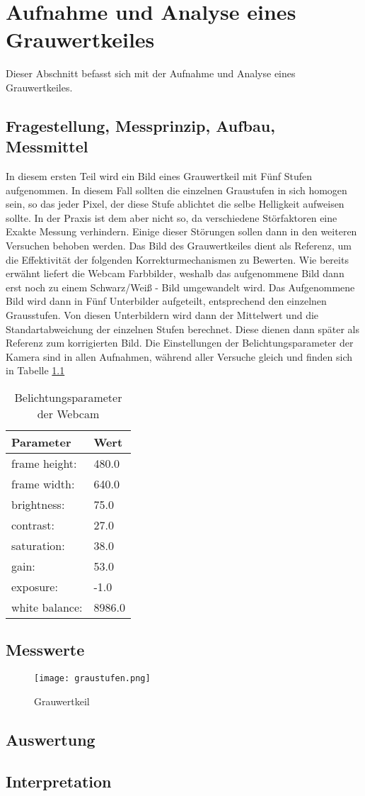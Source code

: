 %
%
\chapter{Aufnahme und Analyse eines Grauwertkeiles}
\label{chap:VERSUCH_1}
Dieser Abschnitt befasst sich mit der Aufnahme und Analyse eines Grauwertkeiles.
\section{Fragestellung, Messprinzip, Aufbau, Messmittel}
\label{chap:VERSUCH_1_FRAGESTELLUNG}
In diesem ersten Teil wird ein Bild eines Grauwertkeil mit Fünf Stufen aufgenommen. In diesem Fall sollten die einzelnen Graustufen in sich homogen sein, so das jeder Pixel, der diese Stufe ablichtet die selbe Helligkeit aufweisen sollte. In der Praxis ist dem aber nicht so, da verschiedene Störfaktoren eine Exakte Messung verhindern. Einige dieser Störungen sollen dann in den weiteren Versuchen behoben werden. Das Bild des Grauwertkeiles dient als Referenz, um die Effektivität der folgenden Korrekturmechanismen zu Bewerten. Wie bereits erwähnt liefert die Webcam Farbbilder, weshalb das aufgenommene Bild dann erst noch zu einem Schwarz/Weiß - Bild umgewandelt wird. Das Aufgenommene Bild wird dann in Fünf Unterbilder aufgeteilt, entsprechend den einzelnen Grausstufen. Von diesen Unterbildern wird dann der Mittelwert und die Standartabweichung der einzelnen Stufen berechnet. Diese dienen dann später als Referenz zum korrigierten Bild. Die Einstellungen der Belichtungsparameter der Kamera sind in allen Aufnahmen, während aller Versuche gleich und finden sich in Tabelle \ref{tab:BelichtungsParamter}
\begin{table}
\centering
\begin{tabular}{l|l}
Parameter & Wert \\
\hline
frame height: & 480.0 \\
frame width: & 640.0 \\
brightness:  &  75.0 \\
contrast:    &  27.0 \\
saturation:  &  38.0\\
gain:        &  53.0\\
exposure:    &  -1.0\\
white balance: & 8986.0 \\
\end{tabular}
\caption{Belichtungsparameter der Webcam}
\label{tab:BelichtungsParamter}
\end{table}


\section{Messwerte}
\label{chap:VERSUCH_1_MESSWERTE}
\begin{figure}[H]
\centering
\texttt{[image: graustufen.png]}
\caption{Grauwertkeil}
\label{img:Grauwertkeil}
\end{figure}
\section{Auswertung}
\label{chap:VERSUCH_1_AUSWERTUNG}

\section{Interpretation}
\label{chap:VERSUCH_1_INTERPRETATION}